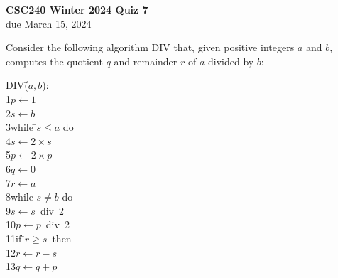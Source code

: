 \documentclass[11pt]{article}
\begin{document}
\begin{center}
{\bf \Large \bf CSC240 Winter 2024  Quiz 7}\\
due March 15, 2024
\end{center}

Consider the following algorithm DIV that, given positive integers $ a $ and $ b$,
computes the quotient $ q $ and remainder $ r $ of $ a $ divided by $ b$:
\begin{center}
\begin{tabbing}
DIV\=($a,b$):\\
1\>$ p \leftarrow 1 $\\
2\>$ s \leftarrow b $\\
3\>while \=$ s\leq a $ do\\
4\>\>$ s \leftarrow 2 \times s $\\
5\>\>$ p \leftarrow 2\times p $\\
6\>$ q \leftarrow 0 $\\
7\>$ r \leftarrow a $\\
8\>while $ s\neq b $ do\\
9\>\>$ s \leftarrow s $~div~2\\
10\>\>$ p \leftarrow p $~div~2\\
11\>\>if \=$ r\geq s $~then\\
12\>\>\>$ r \leftarrow r-s $\\
13\>\>\>$ q \leftarrow q+p$
\end{tabbing}
\end{center}
\end{document}
